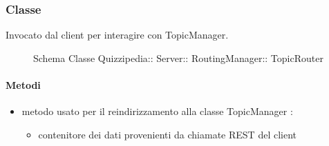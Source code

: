 \subsubsection{Classe }
Invocato dal client per interagire con TopicManager.
\begin{figure}[H]
\centering
\noindent{}
\caption[Schema Classe TopicRouter]{Schema Classe Quizzipedia:: Server:: RoutingManager:: TopicRouter}
\end{figure}
\paragraph{Metodi}
\begin{itemize}
\item {}
\newline
metodo usato per il reindirizzamento alla classe TopicManager
\newline
{} :
\begin{itemize}
\item {}
\newline
contenitore dei dati provenienti da chiamate REST del client
\end{itemize}
\end{itemize}
